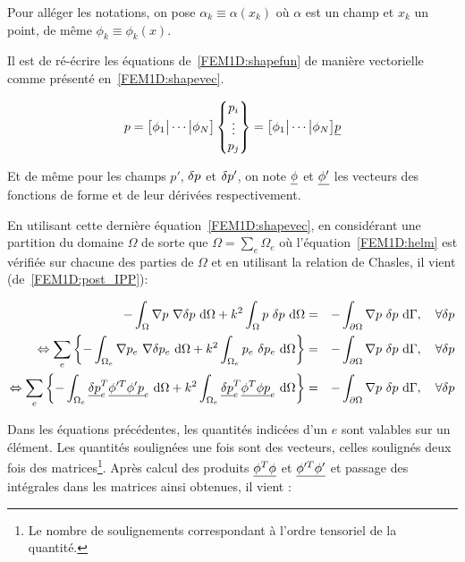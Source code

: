 Pour alléger les notations, on pose $\alpha_k\equiv \alpha(x_k)$ où $\alpha$ est un champ et $x_k$ un point, de même
$\phi_k\equiv\phi_k(x)$.

Il est de ré-écrire les équations de~\eqref{FEM1D:shapefun} de manière vectorielle comme présenté
en~\eqref{FEM1D:shapevec}.

\begin{equation}
        p = \big[\phi_1\big|\cdots\big|\phi_N\big]\begin{Bmatrix}p_i\\\vdots\\p_j\end{Bmatrix} =
			\big[\phi_1\big|\cdots\big|\phi_N\big]\underline{p}\label{FEM1D:shapevec}
\end{equation}

Et de même pour les champs $p'$, $\delta p$ et $\delta p'$, on note $\underline{\phi}$ et $\underline{\phi'}$ les vecteurs des fonctions de
forme et de leur dérivées respectivement.

En utilisant cette dernière équation~\eqref{FEM1D:shapevec}, en considérant une partition du domaine $\Omega$ de sorte
que $\Omega = \sum_e\Omega_e$ où l'équation~\eqref{FEM1D:helm} est vérifiée sur chacune des parties de $\Omega$ et en
utilisant la relation de Chasles, il vient (de~\eqref{FEM1D:post_IPP}):

\begin{eqnarray*}
	- \int_\Omega \nabla p~\nabla \delta p ~\mathrm{d}\Omega + k^2\int_\Omega p~\delta p~\mathrm{d}\Omega & = & -\int_{\partial\Omega}\nabla p~\delta p~\mathrm{d}\Gamma, \quad \forall\delta p\\
\Leftrightarrow \sum_e\left\{- \int_{\Omega_e} \nabla p_e~\nabla \delta p_e ~\mathrm{d}\Omega + k^2\int_{\Omega_e} p_e~\delta p_e~\mathrm{d}\Omega \right\}& = & -\int_{\partial\Omega}\nabla p~\delta p~\mathrm{d}\Gamma, \quad \forall\delta p\\
	\Leftrightarrow \sum_e\left\{- \int_{\Omega_e} \underline{\delta p}_e^T\underline{\phi'^T\phi'}\underline{p}_e~\mathrm{d}\Omega + k^2\int_{\Omega_e} \underline{\delta p}_e^T\underline{\phi^T\phi}\underline{p}_e~\mathrm{d}\Omega \right\}& = & -\int_{\partial\Omega}\nabla p~\delta p~\mathrm{d}\Gamma, \quad \forall\delta p\\
\end{eqnarray*}


Dans les équations précédentes, les quantités indicées d'un $e$ sont valables sur un élément. Les quantités soulignées
une fois sont des vecteurs, celles soulignés deux fois des matrices\footnote{Le nombre de soulignements correspondant à
l'ordre tensoriel de la quantité.}.
Après calcul des produits $\underline{\phi^T\phi}$ et $\underline{\phi'^T\phi'}$ et passage des intégrales dans les matrices ainsi
obtenues, il vient :

